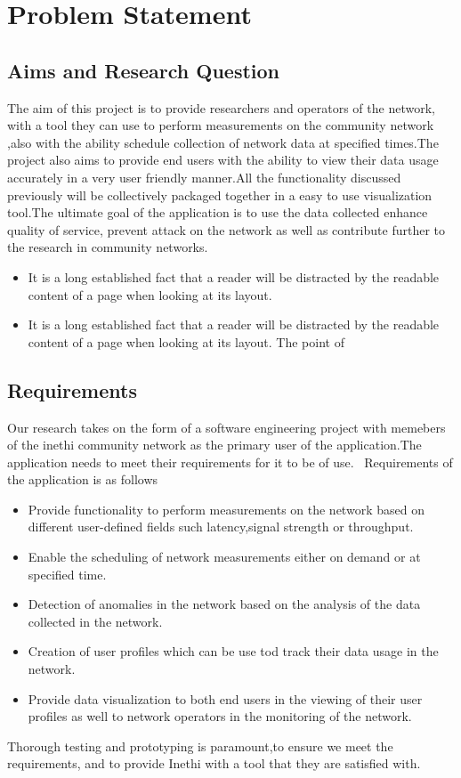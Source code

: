 \section{Problem Statement}
\subsection{Aims and Research Question}
The aim of this project is to provide researchers and operators of the network, with a tool they can use to perform measurements on the community network ,also with the ability schedule collection of network data at specified times.The project also aims to provide end users with the ability to view their data usage accurately in a very user friendly manner.All the functionality discussed previously will be collectively packaged together in a easy to use visualization tool.The ultimate goal of the application is to use the data collected enhance quality of service, prevent attack on the network as well as contribute further to the research in community networks.

\begin{itemize}
	\item It is a long established fact that a reader will be distracted by the readable content of a page when looking at its layout. 
	\item It is a long established fact that a reader will be distracted by the readable content of a page when looking at its layout. The point of 
\end{itemize}

\subsection{Requirements}
Our research takes on the form of a software engineering project with memebers of the inethi community network as the primary user of the application.The application needs to meet their requirements for it to be of use.
\
Requirements of the application is as follows 
\begin{itemize}
	\item Provide functionality to perform measurements on the network based on different user-defined fields such latency,signal strength or throughput.
	
	\item Enable the scheduling of network measurements either on demand or at specified time.  
	
	\item Detection of anomalies in the network based on the analysis of the data collected in the network.
	
	\item Creation of user profiles which can be use tod track their data usage in the network. 
	
	\item Provide data visualization to both end users in the viewing of their user profiles as well to network operators in the monitoring of the network.
\end{itemize}
Thorough testing and prototyping is paramount,to ensure we meet the requirements, and to provide Inethi with a tool that they are satisfied with.
